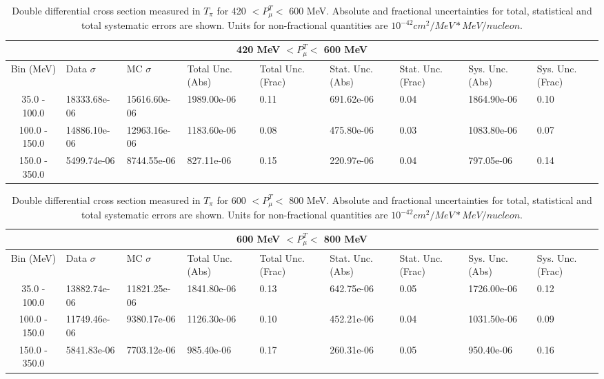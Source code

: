 \begin{table}[!htb]
    \centering
    \tiny
    \begin{tabular}{|c|p{0.5in}|p{0.5in}|p{0.5in}|p{0.5in}|p{0.5in}|p{0.5in}|p{0.5in}|p{0.5in}|}

        \hline
        \multicolumn{9}{c}{420 MeV $ < P^T_\mu < $ 600 MeV}\\
        \hline
        Bin (MeV)& Data $\sigma$ & MC $\sigma$ & Total Unc. (Abs) & Total Unc. (Frac)  & Stat. Unc. (Abs) & Stat. Unc. (Frac) & Sys. Unc. (Abs) & Sys. Unc. (Frac)\\ \hline
35.0 - 100.0 & 18333.68e-06 & 15616.60e-06 & 1989.00e-06 & 0.11 & 691.62e-06 & 0.04 & 1864.90e-06 & 0.10\\ \hline
100.0 - 150.0 & 14886.10e-06 & 12963.16e-06 & 1183.60e-06 & 0.08 & 475.80e-06 & 0.03 & 1083.80e-06 & 0.07\\ \hline
150.0 - 350.0 & 5499.74e-06 & 8744.55e-06 & 827.11e-06 & 0.15 & 220.97e-06 & 0.04 & 797.05e-06 & 0.14\\ \hline

    \end{tabular}
    \caption{Double differential cross section measured in $T_\pi$ for 420 $ < P^T_\mu < $ 600 MeV. Absolute and fractional uncertainties for total, statistical and total systematic errors are shown. Units for non-fractional quantities are $10^{-42}cm^2/MeV*MeV/nucleon$.}
    \label{tab:ApdxA:XSecTable2Dtpiptmu3}
\end{table}

\begin{table}[!htb]
    \centering
    \tiny
    \begin{tabular}{|c|p{0.5in}|p{0.5in}|p{0.5in}|p{0.5in}|p{0.5in}|p{0.5in}|p{0.5in}|p{0.5in}|}

        \hline
        \multicolumn{9}{c}{600 MeV $ < P^T_\mu < $ 800 MeV}\\
        \hline
        Bin (MeV)& Data $\sigma$ & MC $\sigma$ & Total Unc. (Abs) & Total Unc. (Frac)  & Stat. Unc. (Abs) & Stat. Unc. (Frac) & Sys. Unc. (Abs) & Sys. Unc. (Frac)\\ \hline
35.0 - 100.0 & 13882.74e-06 & 11821.25e-06 & 1841.80e-06 & 0.13 & 642.75e-06 & 0.05 & 1726.00e-06 & 0.12\\ \hline
100.0 - 150.0 & 11749.46e-06 & 9380.17e-06 & 1126.30e-06 & 0.10 & 452.21e-06 & 0.04 & 1031.50e-06 & 0.09\\ \hline
150.0 - 350.0 & 5841.83e-06 & 7703.12e-06 & 985.40e-06 & 0.17 & 260.31e-06 & 0.05 & 950.40e-06 & 0.16\\ \hline

    \end{tabular}
    \caption{Double differential cross section measured in $T_\pi$ for 600 $ < P^T_\mu < $ 800 MeV. Absolute and fractional uncertainties for total, statistical and total systematic errors are shown. Units for non-fractional quantities are $10^{-42}cm^2/MeV*MeV/nucleon$.}
    \label{tab:ApdxA:XSecTable2Dtpiptmu4}
\end{table}

